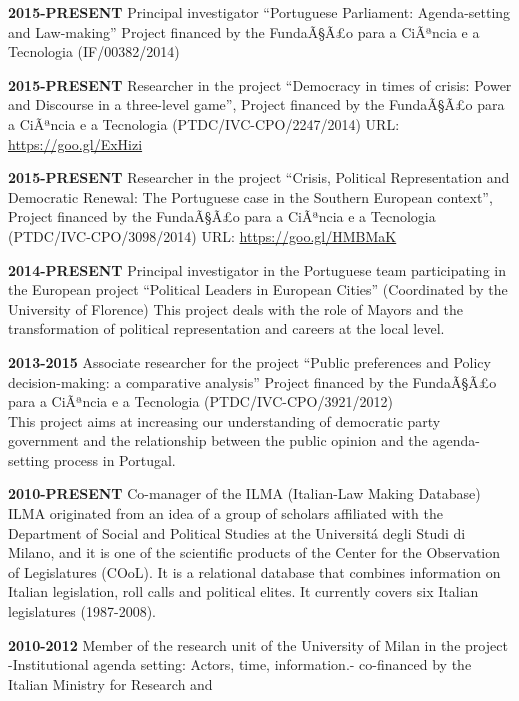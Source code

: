 \documentclass[11pt,]{article}
\renewenvironment{itemize}{
  \begin{list}{}{
    \setlength{\leftmargin}{1.5em}
  }
}{
  \end{list}
}
\begin{document}
\begin{itemize}
\item
  \textbf{2015-PRESENT} Principal investigator ``Portuguese Parliament:
  Agenda-setting and Law-making'' Project financed by the FundaÃ§Ã£o
  para a CiÃªncia e a Tecnologia (IF/00382/2014)
\item
  \textbf{2015-PRESENT} Researcher in the project ``Democracy in times
  of crisis: Power and Discourse in a three-level game'', Project
  financed by the FundaÃ§Ã£o para a CiÃªncia e a Tecnologia
  (PTDC/IVC-CPO/2247/2014) URL: \url{https://goo.gl/ExHizi}
\item
  \textbf{2015-PRESENT} Researcher in the project ``Crisis, Political
  Representation and Democratic Renewal: The Portuguese case in the
  Southern European context'', Project financed by the FundaÃ§Ã£o para a
  CiÃªncia e a Tecnologia (PTDC/IVC-CPO/3098/2014) URL:
  \url{https://goo.gl/HMBMaK}
\item
  \textbf{2014-PRESENT} Principal investigator in the Portuguese team
  participating in the European project ``Political Leaders in European
  Cities'' (Coordinated by the University of Florence) This project
  deals with the role of Mayors and the transformation of political
  representation and careers at the local level.
\item
  \textbf{2013-2015} Associate researcher for the project ``Public
  preferences and Policy decision-making: a comparative analysis''
  Project financed by the FundaÃ§Ã£o para a CiÃªncia e a Tecnologia
  (PTDC/IVC-CPO/3921/2012)\\
  This project aims at increasing our understanding of democratic party
  government and the relationship between the public opinion and the
  agenda-setting process in Portugal.
\item
  \textbf{2010-PRESENT} Co-manager of the ILMA (Italian-Law Making
  Database)\\
  ILMA originated from an idea of a group of scholars affiliated with
  the Department of Social and Political Studies at the Universitá degli
  Studi di Milano, and it is one of the scientific products of the
  Center for the Observation of Legislatures (COoL). It is a relational
  database that combines information on Italian legislation, roll calls
  and political elites. It currently covers six Italian legislatures
  (1987-2008).
\item
  \textbf{2010-2012} Member of the research unit of the University of
  Milan in the project -Institutional agenda setting: Actors, time,
  information.- co-financed by the Italian Ministry for Research and

\end{itemize}
\end{document}
